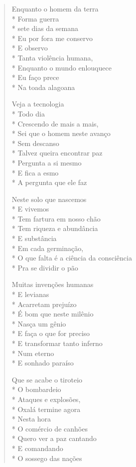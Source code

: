 \begin{verse}
Enquanto o homem da terra\\*
Forma guerra\\*
sete dias da semana\\*
Eu por fora me conservo\\*
E observo\\*
Tanta violência humana,\\*
Enquanto o mundo enlouquece\\*
Eu faço prece\\*
Na toada alagoana

Veja a tecnologia\\*
Todo dia\\*
Crescendo de mais a mais,\\*
Sei que o homem neste avanço\\*
Sem descanso\\*
Talvez queira encontrar paz\\*
Pergunta a si mesmo\\*
E fica a esmo\\*
A pergunta que ele faz

Neste solo que nascemos\\*
E vivemos\\*
Tem fartura em nosso chão\\*
Tem riqueza e abundância\\*
E substância\\*
Em cada germinação,\\*
O que falta é a ciência da consciência\\*
Pra se dividir o pão

Muitas invenções humanas\\*
E levianas\\*
Acarretam prejuízo\\*
É bom que neste milênio\\*
Nasça um gênio\\*
E faça o que for preciso\\*
E transformar tanto inferno\\*
Num eterno\\*
E sonhado paraíso

Que se acabe o tiroteio\\*
O bombardeio\\*
Ataques e explosões,\\*
Oxalá termine agora\\*
Nesta hora\\*
O comércio de canhões\\*
Quero ver a paz cantando\\*
E comandando\\*
O sossego das nações


\end{verse}
